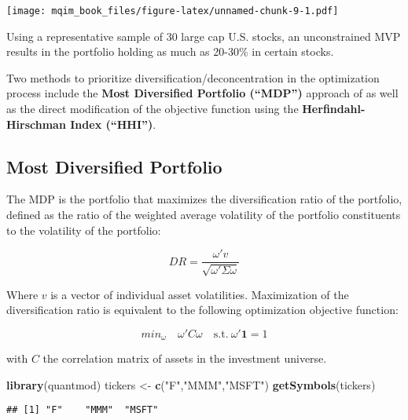 \documentclass[]{book}
\newenvironment{Shaded}{\begin{snugshade}}{\end{snugshade}}
\newcommand{\KeywordTok}[1]{\textcolor[rgb]{0.13,0.29,0.53}{\textbf{#1}}}
\newcommand{\StringTok}[1]{\textcolor[rgb]{0.31,0.60,0.02}{#1}}
\newcommand{\NormalTok}[1]{#1}
\theoremstyle{definition}
\theoremstyle{definition}
\theoremstyle{definition}
\theoremstyle{remark}
\begin{document}
\texttt{[image: mqim\_book\_files/figure-latex/unnamed-chunk-9-1.pdf]}

Using a representative sample of 30 large cap U.S. stocks, an
unconstrained MVP results in the portfolio holding as much as 20-30\% in
certain stocks.

Two methods to prioritize diversification/deconcentration in the
optimization process include the \textbf{Most Diversified Portfolio
(``MDP'')} approach of \citep{choueifaty2008} as well as the direct
modification of the objective function using the
\textbf{Herfindahl-Hirschman Index (``HHI'')}.

\subsection{Most Diversified
Portfolio}\label{most-diversified-portfolio}

The MDP is the portfolio that maximizes the diversification ratio of the
portfolio, defined as the ratio of the weighted average volatility of
the portfolio constituents to the volatility of the portfolio:

\[
DR = \frac{\omega' v}{\sqrt{\omega' \Sigma \omega}}
\]

Where \(v\) is a vector of individual asset volatilities. Maximization
of the diversification ratio is equivalent to the following optimization
objective function:

\[
min_\omega \quad \omega' C \omega \quad \text{s.t.} \ \omega' \mathbf{1} = 1
\]

with \(C\) the correlation matrix of assets in the investment universe.

\begin{Shaded}
\begin{Highlighting}[]
\KeywordTok{library}\NormalTok{(quantmod)}
\NormalTok{tickers <-}\StringTok{ }\KeywordTok{c}\NormalTok{(}\StringTok{"F"}\NormalTok{,}\StringTok{"MMM"}\NormalTok{,}\StringTok{"MSFT"}\NormalTok{)}
\KeywordTok{getSymbols}\NormalTok{(tickers)}
\end{Highlighting}
\end{Shaded}

\begin{verbatim}
## [1] "F"    "MMM"  "MSFT"
\end{verbatim}
\end{document}
